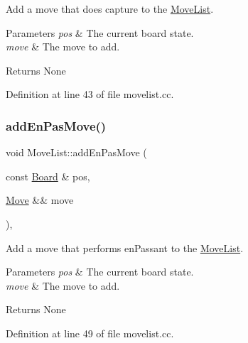 Add a move that does capture to the \mbox{\hyperlink{classMoveList}{Move\+List}}. 


\begin{DoxyParams}{Parameters}
{\em pos} & The current board state. \\
\hline
{\em move} & The move to add. \\
\hline
\end{DoxyParams}
\begin{DoxyReturn}{Returns}
None 
\end{DoxyReturn}


Definition at line 43 of file movelist.\+cc.

\mbox{\label{classMoveList_a7e381e3b0f8e9c7caf670ec470b8143d}} 
\subsubsection{\texorpdfstring{add\+En\+Pas\+Move()}{addEnPasMove()}}
{\footnotesize\ttfamily void Move\+List\+::add\+En\+Pas\+Move (\begin{DoxyParamCaption}\item[{const \mbox{\hyperlink{classBoard}{Board}} \&}]{pos,  }\item[{\mbox{\hyperlink{classMove}{Move}} \&\&}]{move }\end{DoxyParamCaption})\hspace{0.3cm}{\ttfamily [private]}, {\ttfamily [noexcept]}}



Add a move that performs en\+Passant to the \mbox{\hyperlink{classMoveList}{Move\+List}}. 


\begin{DoxyParams}{Parameters}
{\em pos} & The current board state. \\
\hline
{\em move} & The move to add. \\
\hline
\end{DoxyParams}
\begin{DoxyReturn}{Returns}
None 
\end{DoxyReturn}


Definition at line 49 of file movelist.\+cc.

\mbox{\label{classMoveList_ac3af5c03221e2b73cfd7c5a4926c7b03}} 
